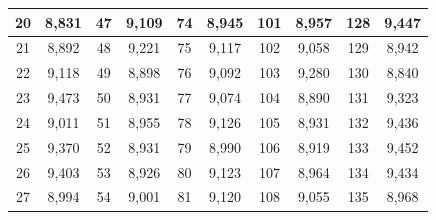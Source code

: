 \documentclass[a4paper, 12pt]{article}
\begin{document}
\begin{longtable}[H]{|c|c|c|c|c|c|c|c|c|c|}
			\hline
			20 & 8,831 & 47 & 9,109 & 74 & 8,945 & 101 & 8,957 & 128 & 9,447 \\
			\hline
			21 & 8,892 & 48 & 9,221 & 75 & 9,117 & 102 & 9,058 & 129 & 8,942 \\
			\hline
			22 & 9,118 & 49 & 8,898 & 76 & 9,092 & 103 & 9,280 & 130 & 8,840 \\
			\hline
			23 & 9,473 & 50 & 8,931 & 77 & 9,074 & 104 & 8,890 & 131 & 9,323 \\
			\hline
			24 & 9,011 & 51 & 8,955 & 78 & 9,126 & 105 & 8,931 & 132 & 9,436 \\
			\hline
			25 & 9,370 & 52 & 8,931 & 79 & 8,990 & 106 & 8,919 & 133 & 9,452 \\
			\hline
			26 & 9,403 & 53 & 8,926 & 80 & 9,123 & 107 & 8,964 & 134 & 9,434 \\
			\hline
			27 & 8,994 & 54 & 9,001 & 81 & 9,120 & 108 & 9,055 & 135 & 8,968 \\
			\hline
		\end{longtable}
\end{document}
